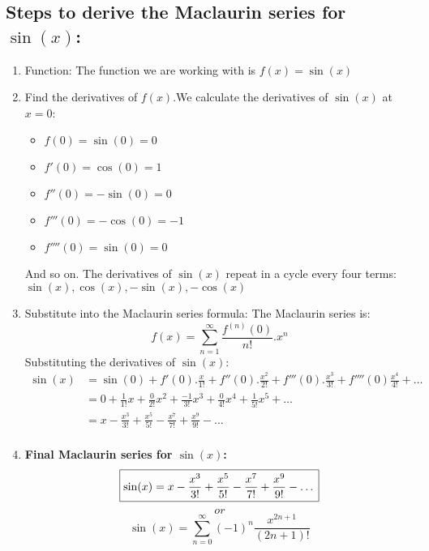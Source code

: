 \documentclass[11pt,a4paper]{article}
\begin{document}
\subsection{Steps to derive the Maclaurin series for $\sin(x)$:}
\begin{enumerate}
\item Function: The function we are working with is $f(x)=\sin(x)$
\item Find the derivatives of $f(x)$.We calculate the derivatives of $\sin(x)$ at $x=0$:
\begin{itemize}
    \item $f(0)=\sin(0)=0$
    \item $f'(0)=\cos(0)=1$
    \item $f''(0)=-\sin(0)=0$
    \item $f'''(0)=-\cos(0)=-1$
    \item $f''''(0)=\sin(0)=0$
\end{itemize}
And so on. The derivatives of $\sin(x)$ repeat in a cycle every four terms:\\
$\sin(x),\cos(x),-\sin(x),-\cos(x)$
\item Substitute into the Maclaurin series formula: The Maclaurin series is:$$f(x)=\sum_{n=1}^{\infty}
\frac{f^{(n)}(0)}{n!}.x^n$$
Substituting the derivatives of $\sin(x)$:
\begin{align*}
    \sin(x)&=\sin(0)+f'(0).\frac{x}{1!}+f''(0).\frac{x^2}{2!}+f'''(0).\frac{x^3}{3!}+f''''(0)\frac{x^4}{4!}+\dots\\
    &=0+\frac{1}{1!}x+\frac{0}{2!}x^2+\frac{-1}{3!}x^3+\frac{0}{4!}x^4+\frac{1}{5!}x^5+\dots\\
    &=x-\frac{x^3}{3!}+\frac{x^5}{5!}-\frac{x^7}{7!}+\frac{x^9}{9!}-\dots\\
\end{align*}
\item\textbf{Final Maclaurin series for $\sin(x)$:}
$$\boxed{\sin(x)=x-\frac{x^3}{3!}+\frac{x^5}{5!}-\frac{x^7}{7!}+\frac{x^9}{9!}-\dots\\}$$
$$or$$
$$\boxed{\sin(x)=\sum_{n=0}^{\infty}(-1)^n\frac{x^{2n+1}}{(2n+1)!}}$$
\end{enumerate}
\end{document}

